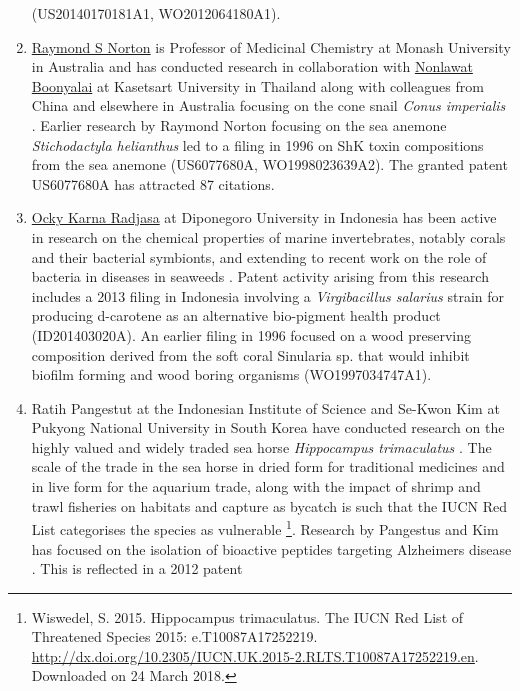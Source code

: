 \documentclass[]{book}
\theoremstyle{definition}
\theoremstyle{definition}
\theoremstyle{definition}
\theoremstyle{remark}
\begin{document}
\begin{enumerate}
  (US20140170181A1, WO2012064180A1).
\item
  \href{https://research.monash.edu/en/persons/raymond-norton}{Raymond S
  Norton} is Professor of Medicinal Chemistry at Monash University in
  Australia and has conducted research in collaboration with
  \href{https://www.researchgate.net/profile/Nonlawat_Boonyalai}{Nonlawat
  Boonyalai} at Kasetsart University in Thailand along with colleagues
  from China and elsewhere in Australia focusing on the cone snail
  \emph{Conus imperialis} \citep{Ye_2012}. Earlier research by Raymond
  Norton focusing on the sea anemone \emph{Stichodactyla helianthus} led
  to a filing in 1996 on ShK toxin compositions from the sea anemone
  (US6077680A, WO1998023639A2). The granted patent US6077680A has
  attracted 87 citations.
\item
  \href{https://scholar.google.co.uk/citations?user=oRy3ajUAAAAJ\&hl=en}{Ocky
  Karna Radjasa} at Diponegoro University in Indonesia has been active
  in research on the chemical properties of marine invertebrates,
  notably corals and their bacterial symbionts, and extending to recent
  work on the role of bacteria in diseases in seaweeds
  \citep{Ayuningrum_2017, Trianto_2017, Syafitri_2017}. Patent activity
  arising from this research includes a 2013 filing in Indonesia
  involving a \emph{Virgibacillus salarius} strain for producing
  d-carotene as an alternative bio-pigment health product
  (ID201403020A). An earlier filing in 1996 focused on a wood preserving
  composition derived from the soft coral Sinularia sp. that would
  inhibit biofilm forming and wood boring organisms (WO1997034747A1).
\item
  Ratih Pangestut at the Indonesian Institute of Science and Se-Kwon Kim
  at Pukyong National University in South Korea have conducted research
  on the highly valued and widely traded sea horse \emph{Hippocampus
  trimaculatus} \citep{Pangestuti_2015}. The scale of the trade in the
  sea horse in dried form for traditional medicines and in live form for
  the aquarium trade, along with the impact of shrimp and trawl
  fisheries on habitats and capture as bycatch is such that the IUCN Red
  List categorises the species as vulnerable \footnote{Wiswedel, S.
    2015. Hippocampus trimaculatus. The IUCN Red List of Threatened
    Species 2015: e.T10087A17252219.
    \url{http://dx.doi.org/10.2305/IUCN.UK.2015-2.RLTS.T10087A17252219.en}.
    Downloaded on 24 March 2018.}. Research by Pangestus and Kim has
  focused on the isolation of bioactive peptides targeting Alzheimers
  disease \citep{Pangestuti_2015}. This is reflected in a 2012 patent

\end{enumerate}
\end{document}
